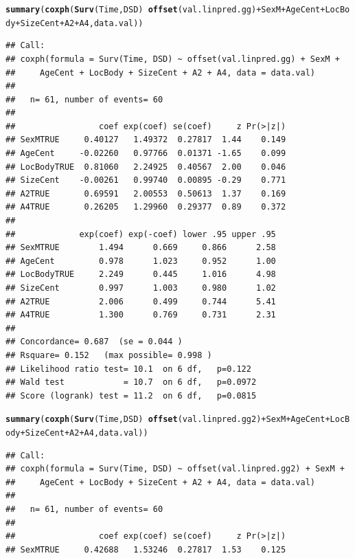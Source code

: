 \documentclass{article}\usepackage[]{graphicx}\usepackage[]{color}
\makeatletter
\newcommand{\hlopt}[1]{\textcolor[rgb]{0,0,0}{#1}}%
\newcommand{\hlstd}[1]{\textcolor[rgb]{0.345,0.345,0.345}{#1}}%
\newcommand{\hlkwd}[1]{\textcolor[rgb]{0.737,0.353,0.396}{\textbf{#1}}}%
\newenvironment{kframe}{%
 \def\at@end@of@kframe{}%
 \ifinner\ifhmode%
  \def\at@end@of@kframe{\end{minipage}}%
  \begin{minipage}{\columnwidth}%
 \fi\fi%
 \def\FrameCommand##1{\hskip\@totalleftmargin \hskip-\fboxsep
 \colorbox{shadecolor}{##1}\hskip-\fboxsep
     \hskip-\linewidth \hskip-\@totalleftmargin \hskip\columnwidth}%
 \MakeFramed {\advance\hsize-\width
   \@totalleftmargin\z@ \linewidth\hsize
   \@setminipage}}%
 {\par\unskip\endMakeFramed%
 \at@end@of@kframe}
\newenvironment{knitrout}{}{} %
\makeatother
\begin{document}
\begin{knitrout}
\begin{kframe}
{\ttfamily\noindent\bfseries\color{errorcolor}{\#\# Error in fitter(X, Y, strats, offset, init, control, weights = weights, : NA/NaN/Inf in foreign function call (arg 6)}}\begin{alltt}
\hlkwd{summary}\hlstd{(}\hlkwd{coxph}\hlstd{(}\hlkwd{Surv}\hlstd{(Time, DSD)} \hlopt{~} \hlkwd{offset}\hlstd{(val.linpred.gg)} \hlopt{+} \hlstd{SexM} \hlopt{+} \hlstd{AgeCent} \hlopt{+} \hlstd{LocBody} \hlopt{+} \hlstd{SizeCent} \hlopt{+} \hlstd{A2} \hlopt{+} \hlstd{A4, data.val))}
\end{alltt}
\begin{verbatim}
## Call:
## coxph(formula = Surv(Time, DSD) ~ offset(val.linpred.gg) + SexM + 
##     AgeCent + LocBody + SizeCent + A2 + A4, data = data.val)
## 
##   n= 61, number of events= 60 
## 
##                 coef exp(coef) se(coef)     z Pr(>|z|)
## SexMTRUE     0.40127   1.49372  0.27817  1.44    0.149
## AgeCent     -0.02260   0.97766  0.01371 -1.65    0.099
## LocBodyTRUE  0.81060   2.24925  0.40567  2.00    0.046
## SizeCent    -0.00261   0.99740  0.00895 -0.29    0.771
## A2TRUE       0.69591   2.00553  0.50613  1.37    0.169
## A4TRUE       0.26205   1.29960  0.29377  0.89    0.372
## 
##             exp(coef) exp(-coef) lower .95 upper .95
## SexMTRUE        1.494      0.669     0.866      2.58
## AgeCent         0.978      1.023     0.952      1.00
## LocBodyTRUE     2.249      0.445     1.016      4.98
## SizeCent        0.997      1.003     0.980      1.02
## A2TRUE          2.006      0.499     0.744      5.41
## A4TRUE          1.300      0.769     0.731      2.31
## 
## Concordance= 0.687  (se = 0.044 )
## Rsquare= 0.152   (max possible= 0.998 )
## Likelihood ratio test= 10.1  on 6 df,   p=0.122
## Wald test            = 10.7  on 6 df,   p=0.0972
## Score (logrank) test = 11.2  on 6 df,   p=0.0815
\end{verbatim}
\begin{alltt}
\hlkwd{summary}\hlstd{(}\hlkwd{coxph}\hlstd{(}\hlkwd{Surv}\hlstd{(Time, DSD)} \hlopt{~} \hlkwd{offset}\hlstd{(val.linpred.gg2)} \hlopt{+} \hlstd{SexM} \hlopt{+} \hlstd{AgeCent} \hlopt{+} \hlstd{LocBody} \hlopt{+} \hlstd{SizeCent} \hlopt{+} \hlstd{A2} \hlopt{+} \hlstd{A4, data.val))}
\end{alltt}
\begin{verbatim}
## Call:
## coxph(formula = Surv(Time, DSD) ~ offset(val.linpred.gg2) + SexM + 
##     AgeCent + LocBody + SizeCent + A2 + A4, data = data.val)
## 
##   n= 61, number of events= 60 
## 
##                 coef exp(coef) se(coef)     z Pr(>|z|)
## SexMTRUE     0.42688   1.53246  0.27817  1.53    0.125

\end{verbatim}
\end{kframe}
\end{knitrout}
\end{document}
